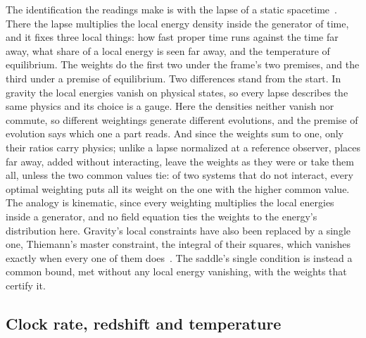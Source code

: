 \documentclass[aps,prd,reprint,superscriptaddress]{revtex4-2}
\begin{document}
\begin{table}[tp]
  \caption{The readings. A matched reading's quantity, computed from the system, takes the value its identification gives; a reading is the identification alone, its quantity computed under its premises. The shadow price is read in Sec.~\ref{sec:forbids}.}
  \label{tab:readings}
  \footnotesize
  
\end{table}

The identification the readings make is with the lapse of a static spacetime~\cite{ArnowittDeserMisner2008,Gourgoulhon2007}. There the lapse multiplies the local energy density inside the generator of time, and it fixes three local things: how fast proper time runs against the time far away, what share of a local energy is seen far away, and the temperature of equilibrium. The weights do the first two under the frame's two premises, and the third under a premise of equilibrium. Two differences stand from the start. In gravity the local energies vanish on physical states, so every lapse describes the same physics and its choice is a gauge. Here the densities neither vanish nor commute, so different weightings generate different evolutions, and the premise of evolution says which one a part reads. And since the weights sum to one, only their ratios carry physics; unlike a lapse normalized at a reference observer, places far away, added without interacting, leave the weights as they were or take them all, unless the two common values tie: of two systems that do not interact, every optimal weighting puts all its weight on the one with the higher common value. The analogy is kinematic, since every weighting multiplies the local energies inside a generator, and no field equation ties the weights to the energy's distribution here. Gravity's local constraints have also been replaced by a single one, Thiemann's master constraint, the integral of their squares, which vanishes exactly when every one of them does~\cite{Thiemann2006}. The saddle's single condition is instead a common bound, met without any local energy vanishing, with the weights that certify it.

\subsection{Clock rate, redshift and temperature}
\label{sec:lapse}
\end{document}
